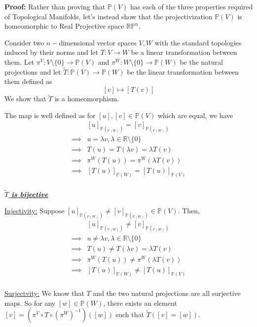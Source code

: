 \documentclass{article}
\newcommand{\bP}{\mathbb{P}}
\newcommand{\R}{\mathbb{R}}
\begin{document}
\vskip 0.5cm
\textbf{Proof:}
Rather than proving that $\bP(V)$ has each of the three properties required of Topological Manifolds, let's instead show that the projectivization $\bP(V)$ is homeomorphic to Real Projective space $\mathbb{RP}^{n}$.

Consider two $n-$dimensional vector spaces $V, W$ with the standard topologies induced by their norms and let $T : V \rightarrow W$ be a linear transformation between them. Let $\pi^V : V \setminus \{0\} \rightarrow \bP(V)$ and $\pi^W : W \setminus \{0\} \rightarrow \bP(W)$ be the natural projections and let $\tilde{T} : \bP(V) \rightarrow \bP(W)$ be the linear transformation between them defined as 
\[ [v] \mapsto [T(v)] \] We show that $\tilde{T}$ is a homeomorphism.

The map is well defined as for  $[u], [v] \in \bP(V)$ which are equal, we have 
\begin{align*}
  &[u]_{\bP(_{\bP(W)})} = [v]_{\bP(_{\bP(W)})} \\
  \implies&u = \lambda v, \lambda \in \R \setminus \{0\} \\
  \implies&T(u) = T(\lambda v) = \lambda T(v) \\
  \implies&\pi^{W}(T(u)) = \pi^{W} (\lambda T(v)) \\
  \implies& [T(u)]_{\bP(W)} = [T(u)]_{\bP(V)}  \\
\end{align*}


\vskip 0.25cm
\underline{\emph{\textbf{$\tilde{T}$ is bijective}}}

\vskip 0.25cm
\underline{Injectivity:}
Suppose $[u]_{\bP(_{\bP(W)})} \neq [v]_{\bP(_{\bP(W)})} \in \bP(V)$. Then,
\begin{align*}
  &[u]_{\bP(_{\bP(W)})} \neq [v]_{\bP(_{\bP(W)})} \\
  \implies&u \neq \lambda v, \lambda \in \R \setminus \{0\} \\
  \implies&T(u) \neq T(\lambda v) = \lambda T(v) \\
  \implies&\pi^{W}(T(u)) \neq \pi^{W} (\lambda T(v)) \\
  \implies& [T(u)]_{\bP(W)} \neq [T(u)]_{\bP(V)}  \\
\end{align*}

\vskip 0.25cm
\underline{Surjectvity:}
We know that $T$ and the two natural projections are all surjective maps. So for any $[w] \in \bP(W)$, there exists an element $[v] = \left(\pi^V \circ T \circ (\pi^W)^{-1}\right)([w])$ such that $\tilde{T}([v] = [w])$.
\end{document}
